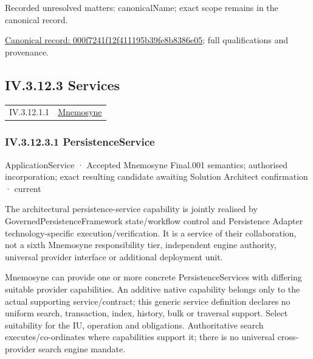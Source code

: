 {\small Recorded unresolved matters: canonicalName; exact scope remains in the canonical record.}\par
{\footnotesize \href{../../../../continuum/application/application-function/000f7241f12f411195b39fe8b8386e05.md}{Canonical record: 000f7241f12f411195b39fe8b8386e05}; full qualifications and provenance.}\par
\subsection*{IV.3.12.3 Services}
\label{navigation:IV.3.12.3}

\begin{longtable}{p{.22\linewidth}p{.73\linewidth}}
IV.3.12.1.1 & \hyperref[element:7985e647bf9e4ca3ba70faf9e3e4ae02]{Mnemosyne} \\
\end{longtable}
\subsubsection*{IV.3.12.3.1 PersistenceService}
\label{navigation:IV.3.12.3.1}

\label{element:c050edfefe8b4d2b8892bc94b2d27a5c}
{\small ApplicationService · Accepted Mnemosyne Final.001 semantics; authorised incorporation; exact resulting candidate awaiting Solution Architect confirmation · current}\par

The architectural persistence-service capability is jointly realised by GovernedPersistenceFramework state/workflow control and Persistence Adapter technology-specific execution/verification. It is a service of their collaboration, not a sixth Mnemosyne responsibility tier, independent engine authority, universal provider interface or additional deployment unit.



Mnemosyne can provide one or more concrete PersistenceServices with differing suitable provider capabilities. An additive native capability belongs only to the actual supporting service/contract; this generic service definition declares no uniform search, transaction, index, history, bulk or traversal support. Select suitability for the IU, operation and obligations. Authoritative search executes/co-ordinates where capabilities support it; there is no universal cross-provider search engine mandate.



